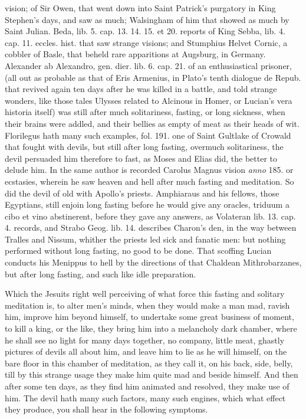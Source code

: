 {vision; of Sir Owen, that went down into Saint Patrick's
purgatory in King Stephen's days, and saw as much; Walsingham of him
that showed as much by Saint Julian. Beda, lib. 5. cap. 13. 14. 15. et
20. reports of King Sebba, lib. 4. cap. 11. eccles. hist. that saw
strange visions; and Stumphius Helvet Cornic, a cobbler of Basle,
that beheld rare apparitions at Augsburg, in Germany. Alexander
ab Alexandro, gen. dier. lib. 6. cap. 21. of an enthusiastical
prisoner, (all out as probable as that of Eris Armenius, in Plato's
tenth dialogue de Repub. that revived again ten days after he was
killed in a battle, and told strange wonders, like those tales Ulysses
related to Alcinous in Homer, or Lucian's vera historia itself) was
still after much solitariness, fasting, or long sickness, when their
brains were addled, and their bellies as empty of meat as their heads
of wit. Florilegus hath many such examples, fol. 191. one of Saint
Gultlake of Crowald that fought with devils, but still after long
fasting, overmuch solitariness, the devil persuaded him therefore
to fast, as Moses and Elias did, the better to delude him. In the
same author is recorded Carolus Magnus vision \emph{anno} 185. or ecstasies,
wherein he saw heaven and hell after much fasting and meditation. So
did the devil of old with Apollo's priests. Amphiaraus and his fellows,
those Egyptians, still enjoin long fasting before he would give any
oracles, triduum a cibo et vino abstinerent, before they gave any
answers, as Volateran lib. 13. cap. 4. records, and Strabo Geog. lib.
14. describes Charon's den, in the way between Tralles and Nissum,
whither the priests led sick and fanatic men: but nothing performed
without long fasting, no good to be done. That scoffing Lucian
conducts his Menippus to hell by the directions of that Chaldean
Mithrobarzanes, but after long fasting, and such like idle preparation.

Which the Jesuits right well perceiving of what force this fasting and
solitary meditation is, to alter men's minds, when they would make a
man mad, ravish him, improve him beyond himself, to undertake some
great business of moment, to kill a king, or the like, they bring
him into a melancholy dark chamber, where he shall see no light for
many days together, no company, little meat, ghastly pictures of devils
all about him, and leave him to lie as he will himself, on the bare
floor in this chamber of meditation, as they call it, on his back,
side, belly, till by this strange usage they make him quite mad and
beside himself. And then after some ten days, as they find him animated
and resolved, they make use of him. The devil hath many such factors,
many such engines, which what effect they produce, you shall hear in
the following symptoms.

}
